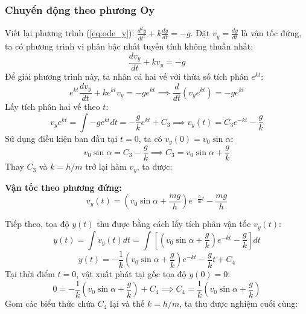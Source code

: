 \subsubsection{Chuyển động theo phương Oy}
Viết lại phương trình (\ref{eq:ode_y}): $\frac{d^2y}{dt^2} + k\frac{dy}{dt} = -g$. Đặt $v_y = \frac{dy}{dt}$ là vận tốc đứng, ta có phương trình vi phân bậc nhất tuyến tính không thuần nhất:
\begin{equation*}
\frac{dv_y}{dt} + kv_y = -g
\end{equation*}
Để giải phương trình này, ta nhân cả hai vế với thừa số tích phân $e^{kt}$:
\begin{equation*}
e^{kt} \frac{dv_y}{dt} + k e^{kt} v_y = -g e^{kt} \implies \frac{d}{dt}\left( v_y e^{kt} \right) = -g e^{kt}
\end{equation*}
Lấy tích phân hai vế theo $t$:
\begin{equation*}
v_y e^{kt} = \int -g e^{kt} dt = -\frac{g}{k} e^{kt} + C_3 \implies v_y(t) = C_3 e^{-kt} - \frac{g}{k}
\end{equation*}
Sử dụng điều kiện ban đầu tại $t = 0$, ta có $v_y(0) = v_0\sin\alpha$:
\begin{equation*}
v_0\sin\alpha = C_3 - \frac{g}{k} \implies C_3 = v_0\sin\alpha + \frac{g}{k}
\end{equation*}
Thay $C_3$ và $k = h/m$ trở lại hàm $v_y$, ta được:

\textbf{Vận tốc theo phương đứng:}
\begin{equation}
v_y(t) = \left(v_0\sin\alpha + \frac{mg}{h}\right)e^{-\frac{h}{m}t} - \frac{mg}{h}
\label{eq:vy}
\end{equation}

Tiếp theo, tọa độ $y(t)$ thu được bằng cách lấy tích phân vận tốc $v_y(t)$:
\begin{equation*}
y(t) = \int v_y(t) dt = \int \left[ \left(v_0\sin\alpha + \frac{g}{k}\right)e^{-kt} - \frac{g}{k} \right] dt
\end{equation*}
\begin{equation*}
y(t) = -\frac{1}{k}\left(v_0\sin\alpha + \frac{g}{k}\right)e^{-kt} - \frac{g}{k}t + C_4
\end{equation*}
Tại thời điểm $t = 0$, vật xuất phát tại gốc tọa độ $y(0) = 0$:
\begin{equation*}
0 = -\frac{1}{k}\left(v_0\sin\alpha + \frac{g}{k}\right) + C_4 \implies C_4 = \frac{1}{k}\left(v_0\sin\alpha + \frac{g}{k}\right)
\end{equation*}
Gom các biểu thức chứa $C_4$ lại và thế $k = h/m$, ta thu được nghiệm cuối cùng:

